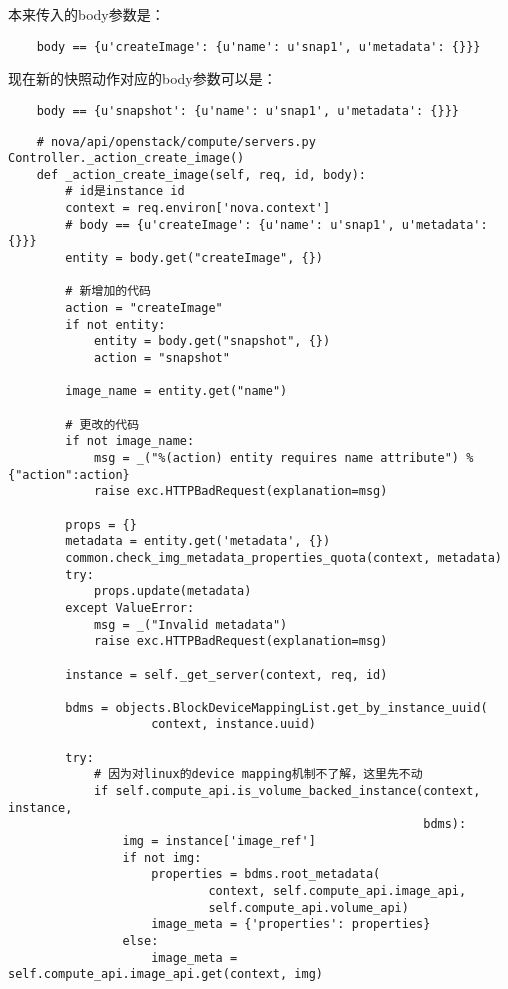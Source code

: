 \documentclass[a4paper,left=1.5cm,right=1.5cm,11pt]{article}
\begin{document}
    本来传入的body参数是：
    \begin{lstlisting}
    body == {u'createImage': {u'name': u'snap1', u'metadata': {}}}
    \end{lstlisting}

    现在新的快照动作对应的body参数可以是：
    \begin{lstlisting}
    body == {u'snapshot': {u'name': u'snap1', u'metadata': {}}}
    \end{lstlisting}

    \begin{lstlisting}
    # nova/api/openstack/compute/servers.py Controller._action_create_image()
    def _action_create_image(self, req, id, body):
        # id是instance id
        context = req.environ['nova.context']
        # body == {u'createImage': {u'name': u'snap1', u'metadata': {}}}
        entity = body.get("createImage", {})
        
        # 新增加的代码
        action = "createImage"
        if not entity:
            entity = body.get("snapshot", {})
            action = "snapshot"

        image_name = entity.get("name")

        # 更改的代码
        if not image_name:
            msg = _("%(action) entity requires name attribute") % {"action":action}
            raise exc.HTTPBadRequest(explanation=msg)

        props = {}
        metadata = entity.get('metadata', {})
        common.check_img_metadata_properties_quota(context, metadata)
        try:
            props.update(metadata)
        except ValueError:
            msg = _("Invalid metadata")
            raise exc.HTTPBadRequest(explanation=msg)
        
        instance = self._get_server(context, req, id)

        bdms = objects.BlockDeviceMappingList.get_by_instance_uuid(
                    context, instance.uuid)

        try:
            # 因为对linux的device mapping机制不了解，这里先不动
            if self.compute_api.is_volume_backed_instance(context, instance,
                                                          bdms):
                img = instance['image_ref']
                if not img:
                    properties = bdms.root_metadata(
                            context, self.compute_api.image_api,
                            self.compute_api.volume_api)
                    image_meta = {'properties': properties}
                else:
                    image_meta = self.compute_api.image_api.get(context, img)
                

\end{lstlisting}
\end{document}
